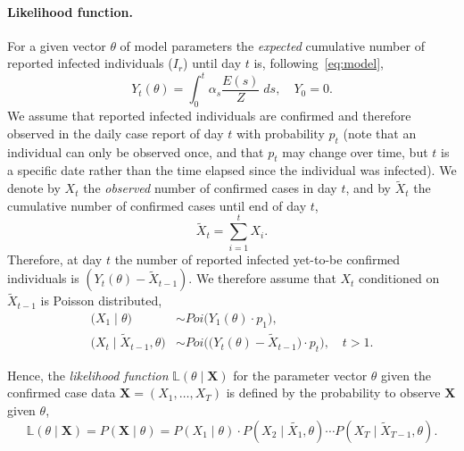 \documentclass[12pt]{extarticle}
\let\vec\mathbf
\begin{document}
\paragraph*{Likelihood function.}
For a given vector $\theta$ of model parameters the \emph{expected} cumulative number of reported infected individuals ($I_r$) until day $t$ is, following~\autoref{eq:model},
\begin{equation} \label{eq:Yt}
Y_t(\theta) = \int_{0}^{t}{\alpha_s \frac{E(s)}{Z} \; ds}, \quad Y_0 = 0.
\end{equation}
We assume that reported infected individuals are confirmed and therefore observed in the daily case report of day $t$ with probability $p_t$ (note that an individual can only be observed once, and that $p_t$ may change over time, but $t$ is a specific date rather than the time elapsed since the individual was infected).
We denote by $X_t$ the \emph{observed} number of confirmed cases in day $t$, and by $\tilde{X}_t$ the cumulative number of confirmed cases until end of day $t$,
\begin{equation} \label{eq:Xsumt}
\tilde{X}_t=\sum_{i=1}^{t}X_i.
\end{equation}
Therefore, at day $t$ the number of reported infected yet-to-be confirmed individuals is
$(Y_t(\theta) - \tilde{X}_{t-1})$.
We therefore assume that $X_t$ conditioned on $\tilde{X}_{t-1}$ is Poisson distributed,
\begin{equation} \label{eq:Xt} \begin{aligned}
\Big(X_1 \mid \theta \Big) & \sim \mathit{Poi}\big( Y_1(\theta) \cdot p_1 \big), \\
\Big(X_t \mid \tilde{X}_{t-1}, \theta \Big) & \sim 
\mathit{Poi}\Big( \big(Y_t(\theta) - \tilde{X}_{t-1}\big) \cdot p_t \Big), \quad t>1.
\end{aligned}\end{equation}

Hence, the \emph{likelihood function} $\mathbb{L}(\theta \mid \vec{X})$ for the parameter vector $\theta$ given the confirmed case data $\vec{X} = (X_1, \ldots, X_T)$ is defined by the probability to observe  $\vec{X}$ given $\theta$,
\begin{equation} \label{eq:likelihood}
\mathbb{L}(\theta \mid \vec{X}) = 
P(\vec{X} \mid \theta) = 
P(X_1 \mid \theta) \cdot P(X_2 \mid \tilde{X_1}, \theta) \cdots P(X_T \mid \tilde{X}_{T-1}, \theta).
\end{equation}



\end{document}
